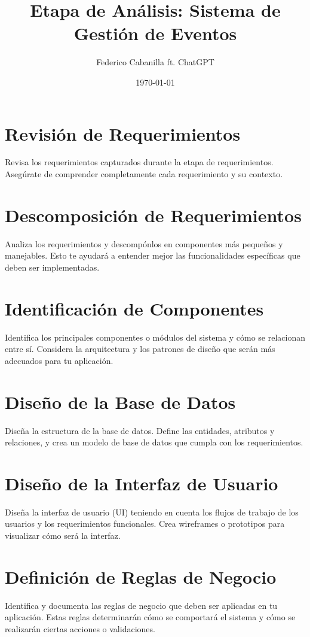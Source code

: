 \documentclass[a4paper]{article}
\title{Etapa de Análisis: Sistema de Gestión de Eventos}
\author{Federico Cabanilla ft. ChatGPT}
\date{\today}
\begin{document}
\maketitle

\section{Revisión de Requerimientos}
Revisa los requerimientos capturados durante la etapa de requerimientos. Asegúrate de comprender completamente cada requerimiento y su contexto.

\section{Descomposición de Requerimientos}
Analiza los requerimientos y descompónlos en componentes más pequeños y manejables. Esto te ayudará a entender mejor las funcionalidades específicas que deben ser implementadas.

\section{Identificación de Componentes}
Identifica los principales componentes o módulos del sistema y cómo se relacionan entre sí. Considera la arquitectura y los patrones de diseño que serán más adecuados para tu aplicación.

\section{Diseño de la Base de Datos}
Diseña la estructura de la base de datos. Define las entidades, atributos y relaciones, y crea un modelo de base de datos que cumpla con los requerimientos.

\section{Diseño de la Interfaz de Usuario}
Diseña la interfaz de usuario (UI) teniendo en cuenta los flujos de trabajo de los usuarios y los requerimientos funcionales. Crea wireframes o prototipos para visualizar cómo será la interfaz.

\section{Definición de Reglas de Negocio}
Identifica y documenta las reglas de negocio que deben ser aplicadas en tu aplicación. Estas reglas determinarán cómo se comportará el sistema y cómo se realizarán ciertas acciones o validaciones.
\end{document}
